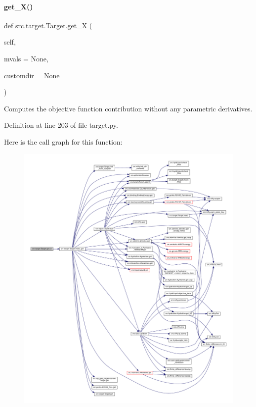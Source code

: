 \paragraph{\texorpdfstring{get\+\_\+\+X()}{get\_X()}}
{\footnotesize\ttfamily def src.\+target.\+Target.\+get\+\_\+X (\begin{DoxyParamCaption}\item[{}]{self,  }\item[{}]{mvals = {\ttfamily None},  }\item[{}]{customdir = {\ttfamily None} }\end{DoxyParamCaption})}



Computes the objective function contribution without any parametric derivatives. 



Definition at line 203 of file target.\+py.

Here is the call graph for this function\+:
\nopagebreak
\begin{figure}[H]
\begin{center}
\leavevmode
\includegraphics[width=350pt]{classsrc_1_1target_1_1Target_acd106ed266687c08937944d4c0d17d87_cgraph}
\end{center}
\end{figure}
\mbox{\label{classsrc_1_1target_1_1Target_a558b52b23367b475a553567cd3ab5a8f}} 
